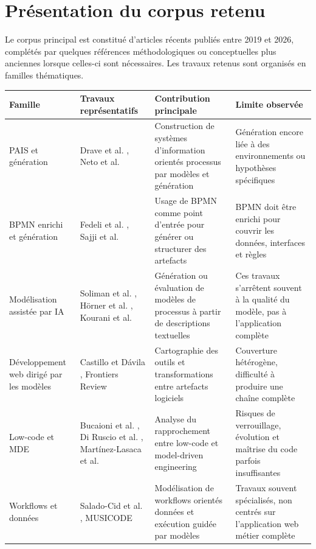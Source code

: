 \documentclass[12pt,a4paper]{article}
\begin{document}
\section{Présentation du corpus retenu}

Le corpus principal est constitué d'articles récents publiés entre 2019 et 2026, complétés par quelques références méthodologiques ou conceptuelles plus anciennes lorsque celles-ci sont nécessaires. Les travaux retenus sont organisés en familles thématiques.

\begin{longtable}{|p{3.6cm}|p{3.4cm}|p{4.4cm}|p{3.8cm}|}
\hline
\textbf{Famille} & \textbf{Travaux représentatifs} & \textbf{Contribution principale} & \textbf{Limite observée} \\
\hline
PAIS et génération & Drave et al. \cite{drave2022}, Neto et al. \cite{neto2022} & Construction de systèmes d'information orientés processus par modèles et génération & Génération encore liée à des environnements ou hypothèses spécifiques \\
\hline
BPMN enrichi et génération & Fedeli et al. \cite{fedeli2024}, Sajji et al. \cite{sajji2023} & Usage de BPMN comme point d'entrée pour générer ou structurer des artefacts & BPMN doit être enrichi pour couvrir les données, interfaces et règles \\
\hline
Modélisation assistée par IA & Soliman et al. \cite{soliman2025}, Hörner et al. \cite{horner2026}, Kourani et al. \cite{kourani2025} & Génération ou évaluation de modèles de processus à partir de descriptions textuelles & Ces travaux s'arrêtent souvent à la qualité du modèle, pas à l'application complète \\
\hline
Développement web dirigé par les modèles & Castillo et Dávila \cite{castillo2024}, Frontiers Review \cite{frontiers2023} & Cartographie des outils et transformations entre artefacts logiciels & Couverture hétérogène, difficulté à produire une chaîne complète \\
\hline
Low-code et MDE & Bucaioni et al. \cite{bucaioni2022}, Di Ruscio et al. \cite{diruscio2022}, Martínez-Lasaca et al. \cite{martinez2026} & Analyse du rapprochement entre low-code et model-driven engineering & Risques de verrouillage, évolution et maîtrise du code parfois insuffisantes \\
\hline
Workflows et données & Salado-Cid et al. \cite{swel2023}, MUSICODE \cite{musicode2025} & Modélisation de workflows orientés données et exécution guidée par modèles & Travaux souvent spécialisés, non centrés sur l'application web métier complète \\
\hline
\end{longtable}
\end{document}
